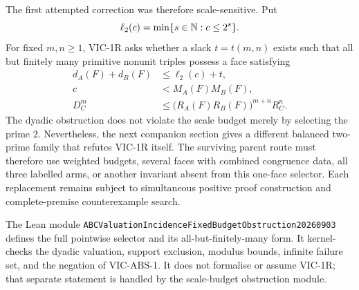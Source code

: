 The first attempted correction was therefore scale-sensitive.  Put
\[
 \ell_2(c)=\min\{s\in\mathbb N:c\le2^s\}.
\]
For fixed $m,n\ge1$, VIC-1R asks whether a slack $t=t(m,n)$ exists such that
all but finitely many primitive nonunit triples possess a face satisfying
\[
 \begin{aligned}
 d_A(F)+d_B(F)&\le\ell_2(c)+t,\\
 c&<M_A(F)M_B(F),\\
 D_C^m&\le\bigl(R_A(F)R_B(F)\bigr)^{m+n}R_C^n.
 \end{aligned}
\tag{VIC-1R}
\]
The dyadic obstruction does not violate the scale budget merely by selecting
the prime $2$.  Nevertheless, the next companion section gives a different
balanced two-prime family that refutes VIC-1R itself.  The surviving parent
route must therefore use weighted budgets, several faces with combined
congruence data, all three labelled arms, or another invariant absent from
this one-face selector.  Each replacement remains subject to simultaneous
positive proof construction and complete-premise counterexample search.

The Lean module
\texttt{ABCValuationIncidenceFixedBudgetObstruction20260903} defines the full
pointwise selector and its all-but-finitely-many form.  It kernel-checks the
dyadic valuation, support exclusion, modulus bounds, infinite failure set, and
the negation of VIC-ABS-1.  It does not formalise or assume VIC-1R; that
separate statement is handled by the scale-budget obstruction module.
